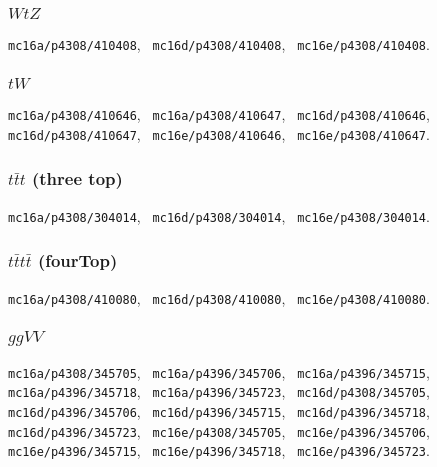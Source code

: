 \subsubsection{$WtZ$}
\texttt{mc16a/p4308/410408}, \texttt{ mc16d/p4308/410408}, \texttt{ mc16e/p4308/410408}.

\subsubsection{$tW$}
\texttt{mc16a/p4308/410646}, \texttt{ mc16a/p4308/410647}, \texttt{ mc16d/p4308/410646},
\newline \texttt{ mc16d/p4308/410647}, \texttt{ mc16e/p4308/410646}, \texttt{ mc16e/p4308/410647}.

\subsubsection{$t\bar{t}t$ (three top)}
\texttt{mc16a/p4308/304014}, \texttt{ mc16d/p4308/304014}, \texttt{ mc16e/p4308/304014}.

\subsubsection{$t\bar{t}t\bar{t}$ (fourTop)}
\texttt{mc16a/p4308/410080}, \texttt{ mc16d/p4308/410080}, \texttt{ mc16e/p4308/410080}.

\subsubsection{$ggVV$}
\texttt{mc16a/p4308/345705}, \texttt{ mc16a/p4396/345706}, \texttt{ mc16a/p4396/345715},
\newline \texttt{ mc16a/p4396/345718}, \texttt{ mc16a/p4396/345723}, \texttt{ mc16d/p4308/345705},
\newline \texttt{ mc16d/p4396/345706}, \texttt{ mc16d/p4396/345715}, \texttt{ mc16d/p4396/345718},
\newline \texttt{ mc16d/p4396/345723}, \texttt{ mc16e/p4308/345705}, \texttt{ mc16e/p4396/345706},
\newline \texttt{ mc16e/p4396/345715}, \texttt{ mc16e/p4396/345718}, \texttt{ mc16e/p4396/345723}.

